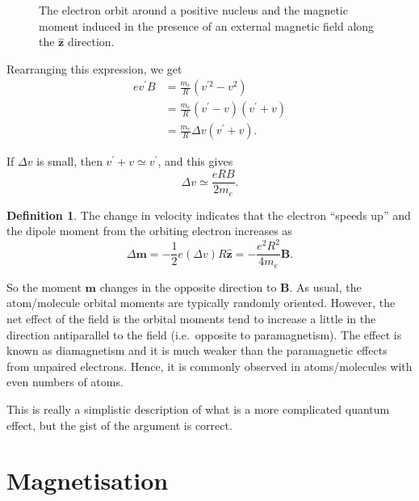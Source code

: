 \documentclass[12pt,chapterprefix=false,dvipsnames]{scrbook}
\theoremstyle{dotless}
\theoremstyle{definition}
\newtheorem{protodefinition}{Definition}[section]
\newenvironment{definition}
{\colorlet{shadecolor}{black!15}\begin{shaded}\begin{protodefinition}}
			{\end{protodefinition}\end{shaded}}
\begin{document}
\begin{figure}[htpb]
	\centering
	
	\caption{The electron orbit around a positive nucleus and the magnetic
		moment induced in the presence of an external magnetic field
		along the $\bm{\hat{z}}$ direction.}%
	\label{fig:diamagnetic}
\end{figure}

Rearranging this expression, we get
\begin{equation}
	\begin{aligned}
        ev^{\prime} B &= \frac{m_e}{R}\left(v^{\prime 2} - v^{2}\right)\\
        &= \frac{m_e}{R}\left(v^\prime - v\right)\left(v^{\prime} + v\right)\\
		            &= \frac{m_e}{R}\Delta{v}\left(v^{\prime} + v\right).
	\end{aligned}
\end{equation}

If $\Delta{v}$ is small, then
$v^\prime + v \simeq v^\prime$, and this gives
\begin{equation}
	\Delta{v}\simeq\frac{eRB}{2m_e}.
\end{equation}

\begin{definition}
	The change in velocity indicates that the electron ``speeds up''
	and the dipole moment from the orbiting electron increases as
	\begin{equation}
		\Delta{\bm{m}}
		=
		-\frac{1}{2}e\left(\Delta{v}\right)R\bm{\hat{z}}
		=
		-\frac{e^{2}R^{2}}{4m_e}\bm{B}.
	\end{equation}
\end{definition}

So the moment $\bm{m}$ changes in the opposite
direction to $\bm{B}$. As usual, the
atom/molecule orbital moments are typically randomly oriented.
However, the net effect of the field is the orbital moments tend
to increase a little in the direction antiparallel to the field
(i.e.\ opposite to paramagnetism). The effect is known as
diamagnetism and it is much weaker than the paramagnetic effects
from unpaired electrons. Hence, it is commonly observed in
atoms/molecules with even numbers of atoms.

This is really a simplistic description of what is a more
complicated quantum effect, but the gist of the argument is
correct.

\section{Magnetisation}%
\label{sec:magnetisation}
\end{document}
